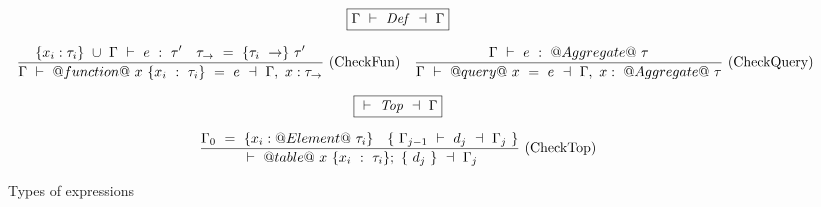 \begin{figure*}
$$
\boxed{\TypecheckS{\Gamma}{\mi{Def}}{\Gamma}}
$$

$$
\ruleIN
{
  \Typecheck{\{x_i:\tau_i\}~\cup~\Gamma}{e}{\tau'}
  \quad
  \tau_\to~=~\{\tau_i~\to\}~\tau'
}
{
  \TypecheckS{\Gamma}{@function@~x~\{x_i~:~\tau_i\}~=~e}{\Gamma,~x:\tau_\to}
}{CheckFun}
\ruleIN
{
  \Typecheck{\Gamma}{e}{@Aggregate@~\tau}
}
{
  \TypecheckS{\Gamma}{@query@~x~=~e}{\Gamma,~x:~@Aggregate@~\tau}
}{CheckQuery}
$$

$$
\boxed{\TypecheckS{}{\mi{Top}}{\Gamma}}
$$

$$
\ruleIN
{
  \Gamma_0~=~\{x_i:@Element@~\tau_i\}
  \quad
  \{~\TypecheckS{\Gamma_{j-1}}{d_j}{\Gamma_j}~\}
}
{
  \TypecheckS
    {}
    {
      @table@
      ~x~\{x_i~:~\tau_i\};
      ~\{~d_j~\}
    }
    {\Gamma_j}
}{CheckTop}
$$


\caption{Types of expressions}
\label{fig:source:type:exp}
\end{figure*}

